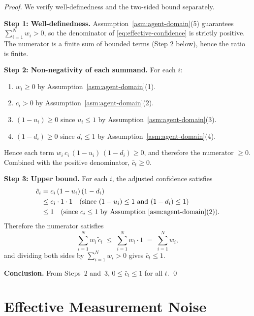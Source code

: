 \documentclass[12pt,openany]{book}
\numberwithin{equation}{chapter}
\theoremstyle{plain}
\theoremstyle{definition}
\theoremstyle{remark}
\begin{document}
\begin{proof}
We verify well-definedness and the two-sided bound separately.

\medskip
\noindent\textbf{Step 1: Well-definedness.}
Assumption~\ref{asm:agent-domain}(5) guarantees
$\sum_{i=1}^{N} w_i > 0$, so the denominator of
\eqref{eq:effective-confidence} is strictly positive.
The numerator is a finite sum of bounded terms (Step 2 below),
hence the ratio is finite.

\medskip
\noindent\textbf{Step 2: Non-negativity of each summand.}
For each $i$:
\begin{enumerate}
  \item $w_i \geq 0$ by Assumption~\ref{asm:agent-domain}(1).
  \item $c_i > 0$ by Assumption~\ref{asm:agent-domain}(2).
  \item $(1 - u_i) \geq 0$ since $u_i \leq 1$ by
        Assumption~\ref{asm:agent-domain}(3).
  \item $(1 - d_i) \geq 0$ since $d_i \leq 1$ by
        Assumption~\ref{asm:agent-domain}(4).
\end{enumerate}
Hence each term $w_i\,c_i\,(1-u_i)\,(1-d_i) \geq 0$, and
therefore the numerator $\geq 0$.  Combined with the positive
denominator, $\bar{c}_t \geq 0$.

\medskip
\noindent\textbf{Step 3: Upper bound.}
For each $i$, the adjusted confidence satisfies
\begin{align}
  \tilde{c}_i
  &= c_i\,(1-u_i)\,(1-d_i) \notag \\
  &\leq c_i \cdot 1 \cdot 1
   \quad\text{(since $(1-u_i)\leq 1$ and $(1-d_i)\leq 1$)}
   \notag \\
  &\leq 1
   \quad\text{(since $c_i \leq 1$ by
   Assumption~\ref{asm:agent-domain}(2)).}
   \label{eq:tilde-c-bound}
\end{align}
Therefore the numerator satisfies
\begin{equation}
  \sum_{i=1}^{N} w_i\,\tilde{c}_i
  \;\leq\;
  \sum_{i=1}^{N} w_i \cdot 1
  \;=\;
  \sum_{i=1}^{N} w_i,
  \label{eq:numerator-bound}
\end{equation}
and dividing both sides by $\sum_{i=1}^{N} w_i > 0$ gives
$\bar{c}_t \leq 1$.

\medskip
\noindent\textbf{Conclusion.}
From Steps~2 and~3, $0 \leq \bar{c}_t \leq 1$ for all $t$.
\qed
\end{proof}

\section{Effective Measurement Noise}
\label{sec:effective-noise}
\end{document}
